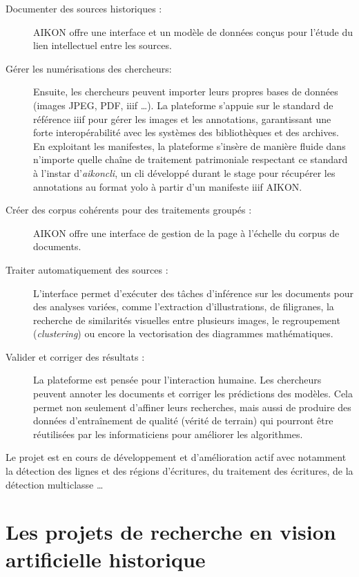 \begin{description}
    \item[Documenter des sources historiques :]
    AIKON offre une interface et un modèle de données conçus pour l'étude du lien intellectuel entre les sources. 
    
    \item[Gérer les numérisations des chercheurs:]
    Ensuite, les chercheurs peuvent importer leurs propres bases de données (images JPEG, PDF, \gls{iiif} \dots). La plateforme s'appuie sur le standard de référence \gls{iiif} pour gérer les images et les annotations, garantissant une forte interopérabilité avec les systèmes des bibliothèques et des archives. En exploitant les manifestes, la plateforme s'insère de manière fluide dans n'importe quelle chaîne de traitement patrimoniale respectant ce standard à l'instar d'\textit{aikoncli}, un \gls{cli} développé durant le stage pour récupérer les annotations au format \gls{yolo} à partir d'un manifeste \gls{iiif} AIKON.
    
    \item[Créer des corpus cohérents pour des traitements groupés :]
    AIKON offre une interface de gestion de la page à l'échelle du corpus de documents. 
    
    \item[Traiter automatiquement des sources :] L'interface permet d'exécuter des tâches d'inférence sur les documents pour des analyses variées, comme l'extraction d'illustrations, de filigranes, la recherche de similarités visuelles entre plusieurs images, le regroupement (\textit{clustering}) ou encore la vectorisation des diagrammes mathématiques.

    \item[Valider et corriger des résultats :] La plateforme est pensée pour l'interaction humaine. Les chercheurs peuvent annoter les documents et corriger les prédictions des modèles. Cela permet non seulement d'affiner leurs recherches, mais aussi de produire des données d'entraînement de qualité (vérité de terrain) qui pourront être réutilisées par les informaticiens pour améliorer les algorithmes.
\end{description}

Le projet est en cours de développement et d'amélioration actif avec notamment la détection des lignes et des régions d'écritures, du traitement des écritures, de la détection multiclasse \dots

\section{Les projets de recherche en vision artificielle historique}

